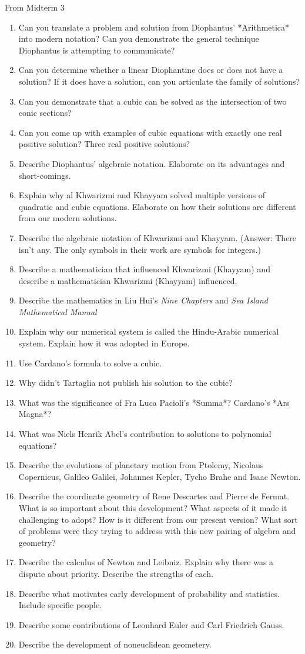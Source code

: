 \documentclass[11pt,fleqn]{article}
\begin{document}
From Midterm 3
\begin{enumerate}
\item Can you translate a problem and solution from Diophantus' *Arithmetica* into modern notation? Can you demonstrate the general technique Diophantus is attempting to communicate?
\item Can you determine whether a linear Diophantine does or does not have a solution? If it does have a solution, can you articulate the family of solutions?
\item Can you demonstrate that a cubic can be solved as the intersection of two conic sections?
\item Can you come up with examples of cubic equations with exactly one real positive solution? Three real positive solutions?
\item Describe Diophantus' algebraic notation. Elaborate on its advantages and short-comings.
\item Explain why al Khwarizmi and Khayyam solved multiple versions of quadratic and cubic equations. Elaborate on how their solutions are different from our modern solutions.
\item Describe the algebraic notation of Khwarizmi and Khayyam. (Answer: There isn't any. The only symbols in their work are symbols for integers.)
\item Describe a mathematician that influenced Khwarizmi (Khayyam) and describe a mathematician Khwarizmi (Khayyam) influenced.
\item Describe the mathematics in Liu Hui's \textit{Nine Chapters} and \textit{Sea Island Mathematical Manual}
\item Explain why our numerical system is called the Hindu-Arabic numerical system. Explain how it was adopted in Europe.
\item Use Cardano's formula to solve a cubic.
\item Why didn't Tartaglia not publish his solution to the cubic?
\item What was the significance of Fra Luca Pacioli's *Summa*? Cardano's *Ars Magna*?
\item What was Niels Henrik Abel's contribution to solutions to polynomial equations?
\item Describe the evolutions of planetary motion from Ptolemy, Nicolaus Copernicus, Galileo Galilei, Johannes Kepler, Tycho Brahe and Isaac Newton.
\item Describe the coordinate geometry of Rene Descartes and Pierre de Fermat. What is so important about this development? What aspects of it made it challenging to adopt? How is it different from our present version? What sort of problems were they trying to address with this new pairing of algebra and geometry?
\item Describe the calculus of Newton and Leibniz. Explain why there was a dispute about priority. Describe the strengths of each.
\item Describe what motivates early development of probability and statistics. Include specific people.
\item Describe some contributions of Leonhard Euler and Carl Friedrich Gauss.
\item Describe the development of noneuclidean geometery. 
\end{enumerate}
\end{document}
